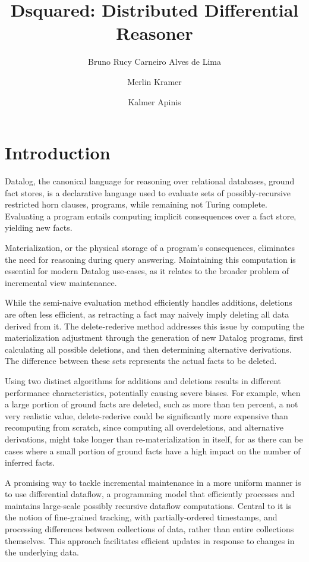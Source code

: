 \documentclass[sigconf,screen,review=false,natbib]{acmart}
\title{Dsquared: Distributed Differential Reasoner}
\author{Bruno Rucy Carneiro Alves de Lima}
\affiliation{%
	\institution{University of Tartu}
	\department{Institute of Computer Science}
	\city{Tartu}
	\country{Estonia}
}
\author{Merlin Kramer}
\affiliation{%
	\institution{unaffiliated}
	\city{Wuppertal}
	\country{Germany}
}
\author{Kalmer Apinis}
\affiliation{%
	\institution{University of Tartu}
	\department{Institute of Computer Science}
	\city{Tartu}
	\country{Estonia}
}
\theoremstyle{definition}
\begin{document}
\maketitle

\section{Introduction}
Datalog\cite{datalog}, the canonical language for reasoning over relational databases, ground fact stores, is a
declarative language used to evaluate sets of possibly-recursive restricted horn clauses, programs, while
remaining not Turing complete. Evaluating a program entails computing implicit consequences over a fact
store, yielding new facts.

Materialization, or the physical storage of a program's consequences, eliminates the need for reasoning
during query answering. Maintaining this computation is essential for modern Datalog use-cases, as it
relates to the broader problem of incremental view maintenance.

While the semi-naive evaluation method\cite{datalog} efficiently handles additions, deletions are often less efficient, as
retracting a fact may naively imply deleting all data derived from it. The delete-rederive\cite{dred} method addresses
this issue by computing the materialization adjustment through the generation of new Datalog programs, first
calculating all possible deletions, and then determining alternative derivations. The difference between these
sets represents the actual facts to be deleted.

Using two distinct algorithms for additions and deletions results in different performance characteristics,
potentially causing severe biases. For example, when a large portion of ground facts are deleted, such as more than
ten percent, a not very realistic value, delete-rederive could be significantly more expensive than recomputing from
scratch, since computing all overdeletions, and alternative derivations, might take longer than re-materialization in itself,
for as there can be cases where a small portion of ground facts have a high impact on the number of inferred facts.

A promising way to tackle incremental maintenance in a more uniform manner is to use differential dataflow, a
programming model that efficiently processes and maintains large-scale possibly recursive dataflow computations. Central
to it is the notion of fine-grained tracking, with partially-ordered timestamps, and processing differences between
collections of data, rather than entire collections themselves. This approach facilitates efficient updates in response
to changes in the underlying data\cite{differential_dataflow}.
\end{document}
